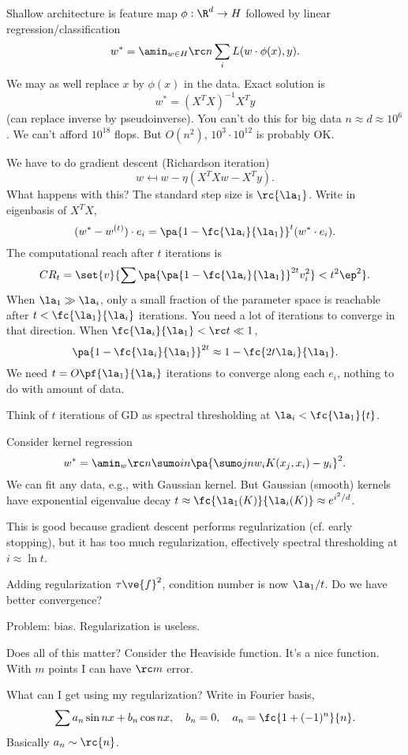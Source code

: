 Shallow architecture is feature map $\phi:\R^d\to H$ followed by linear regression/classification
$$
w^* = \amin_{w\in H} \rc n \sum_i L(w\cdot \phi(x),y).
$$
We may as well replace $x$ by $\phi(x)$ in the data. 
Exact solution is
$$
w^* = (X^TX)^{-1}X^Ty
$$
(can replace inverse by pseudoinverse). You can't do this for big data $n\approx d\approx 10^6$. We can't afford $10^{18}$ flops.  But $O(n^2)$, $10^3\cdot 10^{12}$ is probably OK.

We have to do gradient descent (Richardson iteration)
$$
w\mapsfrom w - \eta(X^TXw - X^Ty).
$$
What happens with this? The standard step size is $\rc{\la_1}$. Write in eigenbasis of $X^TX$,
$$
(w^*-w^{(t)}) \cdot e_i =\pa{1-\fc{\la_i}{\la_1}}^t (w^*\cdot e_i).
$$
The computational reach after $t$ iterations is
$$
CR_t = \set{v}{\sum \pa{\pa{1-\fc{\la_i}{\la_1}}^{2t}v_i^2}<t^2\ep^2}.
$$
When $\la_1\gg \la_i$, only a small fraction of the parameter space is reachable after $t<\fc{\la_1}{\la_i}$ iterations. You need a lot of iterations to converge in that direction.
When $\fc{\la_i}{\la_1} <\rc t\ll 1$, 
$$
\pa{1-\fc{\la_i}{\la_1}}^{2t} \approx 1- \fc{2t\la_i}{\la_1}.
$$
We need $t=O\pf{\la_1}{\la_i}$ iterations to converge along each $e_i$, nothing to do with amount of data.

Think of $t$ iterations of GD as spectral thresholding at $\la_i<\fc{\la_1}{t}$.

Consider kernel regression
$$
w^* = \amin_w \rc n \sumo in \pa{\sumo jn w_i K(x_j,x_i) - y_i}^2.
$$
We can fit any data, e.g., with Gaussian kernel. 
But Gaussian (smooth) kernels have exponential eigenvalue decay $t\approx \fc{\la_1(K)}{\la_i(K)} \approx e^{i^2/d}$.

This is good because gradient descent performs regularization (cf. early stopping), but it has too much regularization, effectively spectral thresholding at $i\approx \ln t$.

Adding regularization $\tau\ve{f}^2$, condition number is now $\la_1/t$. Do we have better convergence?

Problem: bias. Regularization is useless.

Does all of this matter? Consider the Heaviside function. It's a nice function. With $m$ points I can have $\rc m$ error. 

What can I get using my regularization?
Write in Fourier basis,
$$
\sum a_n \sin nx + b_n \cos nx,
\quad b_n=0, \quad a_n=\fc{1+(-1)^n}{n}.
$$
Basically $a_n \sim \rc{n}$. 

